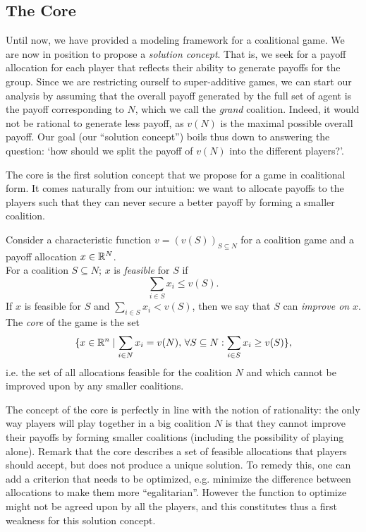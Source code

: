 \subsection{The Core}
Until now, we have provided a modeling framework for a coalitional game.  We are now in position to propose a \emph{solution concept}.  That is, we seek for a payoff allocation for each player that reflects their ability to generate payoffs for the group.  Since we are restricting ourself to super-additive games, we can start our analysis by assuming that the overall payoff generated by the full set of agent is the payoff corresponding to $N$, which we call the \emph{grand} coalition.  Indeed, it would not be rational to generate less payoff, as $v(N)$ is the maximal possible overall payoff.  Our goal (our ``solution concept'') boils thus down to answering the question: `how should we split the payoff of $v(N)$ into the different players?'.

The core is the first solution concept that we propose for a game in coalitional form.  It comes naturally from our intuition: we want to allocate payoffs to the players such that they can never secure a better payoff by forming a smaller coalition.
\begin{definition}
Consider a characteristic function $v = (v(S))_{S \subseteq N}$ for a coalition game and a payoff allocation $x \in \mathbb{R}^N$.\\
 For a coalition $S \subseteq N$; $x$ is \emph{feasible} for $S$ if $$\sum_{i \in S} x_i \leq v(S).$$
If $x$ is feasible for $S$ and $\sum_{i \in S} x_i < v(S)$, then we say that $S$ can \emph{improve on} $x$.\\
The \emph{core} of the game is the set
$$ \{x \in \mathbb{R}^n \mid \sum_{i \in N} x_i = v(N), \, \forall S \subseteq N:  \sum_{i \in S} x_i \geq v(S)\}, $$
i.e. the set of all allocations feasible for the coalition $N$ and which cannot be improved upon by any smaller coalitions.
\end{definition}

The concept of the core is perfectly in line with the notion of rationality: the only way players will play together in a big coalition $N$ is that they cannot improve their payoffs by forming smaller coalitions (including the possibility of playing alone).
Remark that the core describes a set of feasible allocations that players should accept, but does not produce a unique solution. To remedy this, one can add a criterion that needs to be optimized, e.g. minimize the difference between allocations to make them more ``egalitarian''. However the function to optimize might not be agreed upon by all the players, and this constitutes thus a first weakness for this solution concept.

